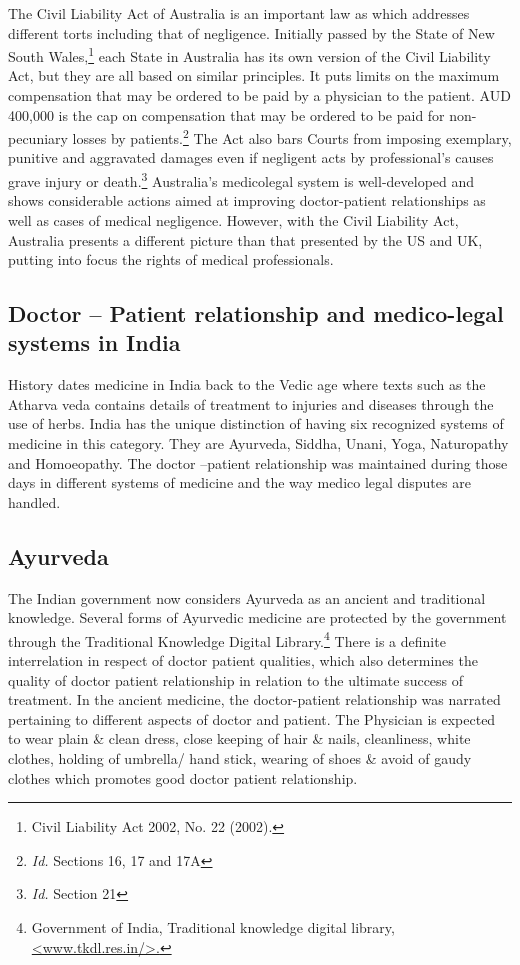 \begin{multicols}{2}
\noi
The Civil Liability Act of Australia is an important law as which addresses different torts including that of negligence. Initially passed by the State of New South Wales,\footnote{Civil Liability Act 2002, No. 22 (2002).} each State in Australia has its own version of the Civil Liability Act, but they are all based on similar principles. It puts limits on the maximum compensation that may be ordered to be paid by a physician to the patient. AUD 400,000 is the cap on compensation that may be ordered to be paid for non-pecuniary losses by patients.\footnote{\textit{Id.} Sections 16, 17 and 17A} The Act also bars Courts from imposing exemplary, punitive and aggravated damages even if negligent acts by professional’s causes grave injury or death.\footnote{\textit{Id.} Section 21} Australia’s medicolegal system is well-developed and shows considerable actions aimed at improving doctor-patient relationships as well as cases of medical negligence. However, with the Civil Liability Act, Australia presents a different picture than that presented by the US and UK, putting into focus the rights of medical professionals.

\subsection*{Doctor – Patient relationship and medico-legal systems in India}

\noi
History dates medicine in India back to the Vedic age where texts such as the Atharva
veda contains details of treatment to injuries and diseases through the use of herbs. India
has the unique distinction of having six recognized systems of medicine in this category.
They are Ayurveda, Siddha, Unani, Yoga, Naturopathy and Homoeopathy. The doctor
–patient relationship was maintained during those days in different systems of medicine
and the way medico legal disputes are handled.

\subsection*{Ayurveda}

\noi
The Indian government now considers Ayurveda as an ancient and traditional
knowledge. Several forms of Ayurvedic medicine are protected by the government
through the Traditional Knowledge Digital Library.\footnote{Government of India, Traditional knowledge digital library,  \url{<www.tkdl.res.in/>.}} There is a definite interrelation in respect of doctor patient qualities, which also determines the quality of doctor patient relationship in relation to the ultimate success of treatment. In the ancient medicine, the doctor-patient relationship was narrated pertaining to different aspects of doctor and patient. The Physician is expected to wear plain \& clean dress, close keeping of hair \& nails, cleanliness, white clothes, holding of umbrella/ hand stick, wearing of shoes \& avoid of gaudy clothes which promotes good doctor patient relationship.


\end{multicols}
